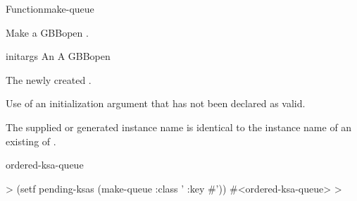 \documentclass[10pt,twoside,english,pdftex]{article}
\begin{document}
\begin{functiondoc}{Function}{make-queue}{%
    }
%
%
%

\fnsyntax

\fnpurpose Make a GBBopen .

\fnpackage {}

\fnmodule {}

\fnargs
\begin{args}{initargs}
\arg[initargs] An 
\arg[queue] A GBBopen 
\end{args}

\fnreturns The newly created .
  
\fnerrors
Use of an initialization argument that has not been declared as valid.

The supplied or generated instance name is identical to the instance name of
an existing  of .

\begin{alsos}{ordered-ksa-queue}
\also[queue]
\end{alsos}

\fnexample
{}%
%
%
\W\supp
\begin{example}
  > (setf pending-ksas (make-queue :class '
                                   :key #'))
  #<ordered-ksa-queue>
  >
\end{example}

\end{functiondoc}

\end{document}
